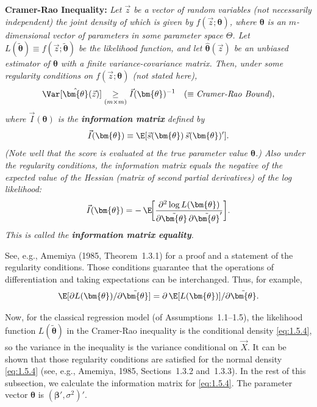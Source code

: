 \medskip
\noindent\textbf{Cramer-Rao Inequality:}\enspace
\textit{Let\/ $\vec{z}$ be a vector of random variables (not necessarily independent) the
joint density of which is given by $f(\vec{z}; \bm{\theta})$, where $\bm{\theta}$ is an
$m$-dimensional vector of parameters in some parameter space $\Theta$.  Let
$L(\tilde{\bm{\theta}}) \equiv f(\vec{z}; \tilde{\bm{\theta}})$ be the likelihood function,
and let\/ $\hat{\bm{\theta}}(\vec{z})$ be an unbiased estimator of\/ $\bm{\theta}$ with a
finite variance-covariance matrix.  Then, under some regularity conditions on
$f(\vec{z}; \bm{\theta})$ (not stated here),}
%
\[
  \Var[\hat{\bm{\theta}}(\vec{z})]
    \underset{(m \times m)}{\geq}
    \vec{I}(\bm{\theta})^{-1}
  \quad (\equiv \textit{Cramer-Rao Bound}),
\]
%
\textit{where\/ $\vec{I}(\bm{\theta})$ is the \textbf{information matrix} defined by}
%
\begin{equation}
  \vec{I}(\bm{\theta})
    \equiv \E[\vec{s}(\bm{\theta})\,\vec{s}(\bm{\theta})'].
  \label{eq:1.5.10}
\end{equation}
%
\textit{(Note well that the score is evaluated at the true parameter value $\bm{\theta}$.)
Also under the regularity conditions, the information matrix equals the negative of the
expected value of the Hessian (matrix of second partial derivatives) of the log likelihood:}
%
\begin{equation}
  \vec{I}(\bm{\theta})
    = -\,\E\!\biggl[
        \frac{\partial^2 \log L(\bm{\theta})}
             {\partial \tilde{\bm{\theta}}\,\partial \tilde{\bm{\theta}}'}
      \biggr].
  \label{eq:1.5.11}
\end{equation}
%
\textit{This is called the \textbf{information matrix equality}.}

\medskip

See, e.g., Amemiya (1985, Theorem~1.3.1) for a proof and a statement of the regularity
conditions.  Those conditions guarantee that the operations of differentiation and taking
expectations can be interchanged.  Thus, for example,
%
\[
  \E[\partial L(\bm{\theta}) / \partial \tilde{\bm{\theta}}]
    = \partial\, \E[L(\bm{\theta})] / \partial \tilde{\bm{\theta}}.
\]

Now, for the classical regression model (of Assumptions~1.1--1.5), the likelihood function
$L(\tilde{\bm{\theta}})$ in the Cramer-Rao inequality is the conditional density
\eqref{eq:1.5.4}, so the variance in the inequality is the variance conditional on
$\vec{X}$.  It can be shown that those regularity conditions are satisfied for the normal
density \eqref{eq:1.5.4} (see, e.g., Amemiya, 1985, Sections~1.3.2 and~1.3.3).  In the
rest of this subsection, we calculate the information matrix for \eqref{eq:1.5.4}.  The
parameter vector $\bm{\theta}$ is $(\bm{\beta}', \sigma^2)'$.

